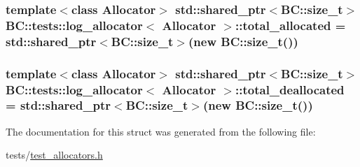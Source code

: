\subsubsection[{\texorpdfstring{total\+\_\+allocated}{total_allocated}}]{\setlength{\rightskip}{0pt plus 5cm}template$<$class Allocator$>$ std\+::shared\+\_\+ptr$<${\bf B\+C\+::size\+\_\+t}$>$ {\bf B\+C\+::tests\+::log\+\_\+allocator}$<$ {\bf Allocator} $>$\+::total\+\_\+allocated = std\+::shared\+\_\+ptr$<${\bf B\+C\+::size\+\_\+t}$>$(new {\bf B\+C\+::size\+\_\+t}())}\hypertarget{structBC_1_1tests_1_1log__allocator_a683a18471dcf4a5d253862c24d4a05a8}{}\label{structBC_1_1tests_1_1log__allocator_a683a18471dcf4a5d253862c24d4a05a8}
\subsubsection[{\texorpdfstring{total\+\_\+deallocated}{total_deallocated}}]{\setlength{\rightskip}{0pt plus 5cm}template$<$class Allocator$>$ std\+::shared\+\_\+ptr$<${\bf B\+C\+::size\+\_\+t}$>$ {\bf B\+C\+::tests\+::log\+\_\+allocator}$<$ {\bf Allocator} $>$\+::total\+\_\+deallocated = std\+::shared\+\_\+ptr$<${\bf B\+C\+::size\+\_\+t}$>$(new {\bf B\+C\+::size\+\_\+t}())}\hypertarget{structBC_1_1tests_1_1log__allocator_ac67d73b48ae664682454e6ecc0b0e7fc}{}\label{structBC_1_1tests_1_1log__allocator_ac67d73b48ae664682454e6ecc0b0e7fc}


The documentation for this struct was generated from the following file\+:\begin{DoxyCompactItemize}
\item 
tests/\hyperlink{test__allocators_8h}{test\+\_\+allocators.\+h}\end{DoxyCompactItemize}
